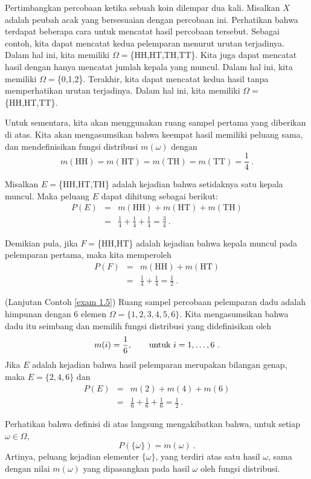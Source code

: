 \begin{example}\label{exam 1.6}
Pertimbangkan percobaan ketika sebuah koin dilempar dua kali.  Misalkan $X$ adalah peubah acak yang
bersesuaian dengan percobaan ini.  Perhatikan bahwa terdapat beberapa cara untuk mencatat hasil
percobaan tersebut.  Sebagai contoh, kita dapat mencatat kedua pelemparan menurut urutan
terjadinya.  Dalam hal ini, kita memiliki $\Omega = $\{HH,HT,TH,TT\}.  Kita juga dapat mencatat hasil
dengan hanya mencatat jumlah kepala yang muncul.  Dalam hal ini, kita memiliki $\Omega =
$\{0,1,2\}.  Terakhir, kita dapat mencatat kedua hasil tanpa memperhatikan urutan
terjadinya.  Dalam hal ini, kita memiliki $\Omega = $\{HH,HT,TT\}.
\par
Untuk sementara, kita akan menggunakan ruang sampel pertama yang diberikan di atas.  Kita akan mengasumsikan bahwa
keempat hasil memiliki peluang sama, dan mendefinisikan fungsi distribusi $m(\omega)$ dengan
$$
m(\mbox{HH}) = m(\mbox{HT}) = m(\mbox{TH}) = m(\mbox{TT}) = \frac14\ .
$$
\par
Misalkan $E = $\{HH,HT,TH\} adalah kejadian bahwa setidaknya satu kepala muncul.  Maka peluang
$E$ dapat dihitung sebagai berikut: 
\begin{eqnarray*}
P(E) &=& m(\mbox{HH}) + m(\mbox{HT}) + m(\mbox{TH}) \\
     &=& \frac14 + \frac14 + \frac14 = \frac34\ .
\end{eqnarray*}

Demikian pula, jika $F = $\{HH,HT\} adalah kejadian bahwa kepala muncul pada pelemparan pertama, maka kita memperoleh
\begin{eqnarray*}
P(F) &=& m(\mbox{HH}) + m(\mbox{HT}) \\
     &=& \frac14 + \frac14 = \frac12\ .
\end{eqnarray*}
\end{example}
 
\begin{example}\label{1.8}(Lanjutan Contoh \ref{exam 1.5})
Ruang sampel percobaan pelemparan dadu adalah
himpunan dengan 6 elemen
$\Omega = \{1,2,3,4,5,6\}$.  Kita mengasumsikan bahwa dadu itu seimbang dan memilih
fungsi distribusi yang didefinisikan oleh
$$
m(i) = \frac16, \qquad {\rm{untuk}}\,\, i = 1, \dots, 6\ .
$$
Jika $E$ adalah kejadian bahwa hasil pelemparan merupakan bilangan genap, maka $E =
\{2,4,6\}$ dan
\begin{eqnarray*}
P(E) &=& m(2) + m(4) + m(6) \\
     &=& \frac16 + \frac16 + \frac16 = \frac12\ .
\end{eqnarray*}
\end{example}
\par
Perhatikan bahwa definisi di atas langsung mengakibatkan bahwa, untuk
setiap $\omega \in \Omega$,
$$
P(\{\omega\}) = m(\omega)\ .
$$
Artinya, peluang kejadian elementer $\{\omega\}$, yang terdiri atas
satu hasil $\omega$, sama dengan nilai $m(\omega)$ yang dipasangkan pada
hasil $\omega$ oleh fungsi distribusi.
 
